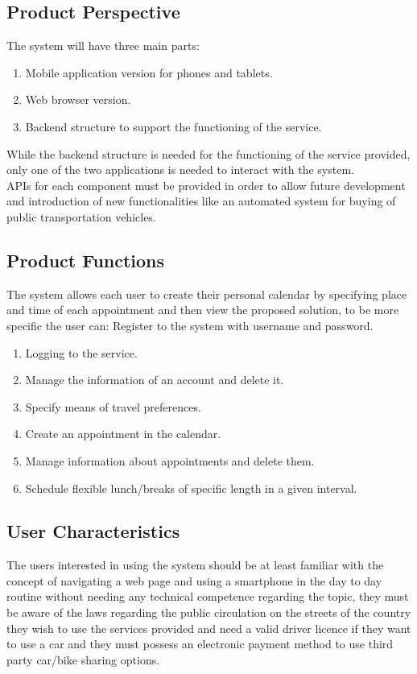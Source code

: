 \subsection{Product Perspective}
The system will have three main parts:
\begin{enumerate}
\item Mobile application version for phones and tablets.
\item Web browser version.
\item Backend structure to support the functioning of the service.
\end{enumerate}
While the backend structure is needed for the functioning of the service provided, only one of the two applications is needed to interact with the system.\\
APIs for each component must be provided in order to allow future development and introduction of new functionalities like an automated system for buying of public transportation vehicles.\par
\subsection{Product Functions}
The system allows each user to create their personal calendar by specifying place and time of each appointment and then view the proposed solution, to be more specific the user can:
Register to the system with username and password.
\begin{enumerate}
\item Logging to the service.
\item Manage the information of an account and delete it.
\item Specify means of travel preferences.
\item Create an appointment in the calendar.
\item Manage information about appointments and delete them.
\item Schedule flexible lunch/breaks of specific length in a given interval.
\end{enumerate}
\par
\subsection{User Characteristics}
The users interested in using the system should be at least familiar with the concept of navigating a web page and using a smartphone in the day to day routine without needing any technical competence regarding the topic, they must be aware of the laws regarding the public circulation on the streets of the country they wish to use the services provided and need a valid driver licence if they want to use a car and they must possess an electronic payment method to use third party car/bike sharing options.
\par
